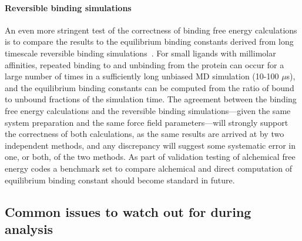 \documentclass[9pt,bestpractices]{livecoms}
\begin{document}
\paragraph{Reversible binding simulations}
An even more stringent test of the correctness of binding free energy calculations is to compare the results to the equilibrium binding constants derived from long timescale reversible binding simulations~\cite{pan2017quantitative}. For small ligands with millimolar affinities, repeated binding to and unbinding from the protein can occur for a large number of times in a sufficiently long unbiased MD simulation (10-100 $\mu$s), and the equilibrium binding constants can be computed from the ratio of bound to unbound fractions of the simulation time. The agreement between the binding free energy calculations and the reversible binding simulations---given the same system preparation and the same force field parameters---will strongly support the correctness of both calculations, as the same results are arrived at by two independent methods, and any discrepancy will suggest some systematic error in one, or both, of the two methods. As part of validation testing of alchemical free energy codes a benchmark set to compare alchemical and direct computation of equilibrium binding constant should become standard in future.

\subsection{Common issues to watch out for during analysis}
\end{document}
